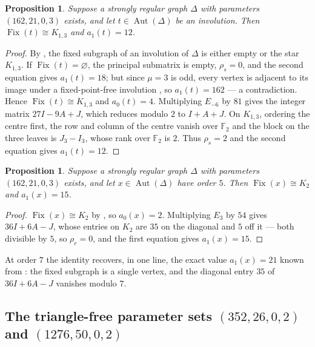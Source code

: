 \documentclass[11pt]{article}
\theoremstyle{plain}
\newtheorem{proposition}[theorem]{Proposition}
\theoremstyle{remark}
\newcommand{\Aut}{\operatorname{Aut}}
\newcommand{\Fix}{\operatorname{Fix}}
\newcommand{\Ftwo}{\mathbb F_2}
\begin{document}
\begin{proposition}\label{prop:162-inv}
Suppose a strongly regular graph $\Delta$ with parameters $(162,21,0,3)$ exists, and let $t\in\Aut(\Delta)$ be an involution.
Then $\Fix(t)\cong K_{1,3}$ and $a_1(t)=12$.
\end{proposition}

\begin{proof}
By \cite[Theorem, statement (1)]{MakhnevNosov},
the fixed subgraph of an involution of $\Delta$ is either empty or the star $K_{1,3}$.
If $\Fix(t)=\varnothing$, the principal submatrix is empty, $\rho_s=0$,
and the second equation gives $a_1(t)=18$;
but since $\mu=3$ is odd, every vertex is adjacent to its image under a fixed-point-free involution \cite[proof of Lemma 2.2]{MakhnevNosov}, so $a_1(t)=162$ --- a contradiction.
Hence $\Fix(t)\cong K_{1,3}$ and $a_0(t)=4$.
Multiplying $E_{-6}$ by $81$ gives the integer matrix $27I-9A+J$, which reduces modulo $2$ to $I+A+J$.
On $K_{1,3}$, ordering the centre first,
the row and column of the centre vanish over $\Ftwo$ and the block on the three leaves is $J_3-I_3$,
whose rank over $\Ftwo$ is $2$.
Thus $\rho_s=2$ and the second equation gives $a_1(t)=12$.
\end{proof}

\begin{proposition}\label{prop:162-5}
Suppose a strongly regular graph $\Delta$ with parameters $(162,21,0,3)$ exists, and let $x\in\Aut(\Delta)$ have order $5$.
Then $\Fix(x)\cong K_2$ and $a_1(x)=15$.
\end{proposition}

\begin{proof}
$\Fix(x)\cong K_2$ by \cite[Theorem, statement (3)]{MakhnevNosov}, so $a_0(x)=2$.
Multiplying $E_3$ by $54$ gives $36I+6A-J$, whose entries on $K_2$ are $35$ on the diagonal and $5$ off it
--- both divisible by $5$, so $\rho_r=0$,
and the first equation gives $a_1(x)=15$.
\end{proof}

At order $7$ the identity recovers, in one line, the exact value $a_1(x)=21$ known from \cite[Lemma 2.3]{MakhnevNosov}:
the fixed subgraph is a single vertex, and the diagonal entry $35$ of $36I+6A-J$ vanishes modulo $7$.

\subsection{\texorpdfstring{The triangle-free parameter sets $(352,26,0,2)$ and $(1276,50,0,2)$}{The triangle-free parameter sets (352,26,0,2) and (1276,50,0,2)}}\label{subsec:mu2}
\end{document}
